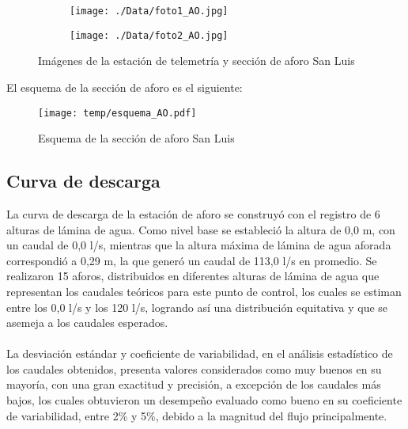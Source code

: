 \documentclass[]{article}
\begin{document}
\begin{figure}[H]
  \centering
\begin{subfigure}{.49\textwidth}
  \texttt{[image: ./Data/foto1\_AO.jpg]}
\end{subfigure}
\hfill
\begin{subfigure}{.49\textwidth}
  \texttt{[image: ./Data/foto2\_AO.jpg]}
\end{subfigure}
\caption{Imágenes de la estación de telemetría y sección de aforo San Luis}
\label{fig:fotos_15}
\end{figure}

El esquema de la sección de aforo es el siguiente:

\begin{figure}[H]
  \centering
  \texttt{[image: temp/esquema\_AO.pdf]}
\caption{Esquema de la sección de aforo San Luis}
\label{fig:Esquema_AO}
\end{figure}

\subsection{Curva de descarga}\label{curva-de-descarga-14}

La curva de descarga de la estación de aforo se construyó con el registro de 6 alturas de lámina de agua. Como nivel base se estableció la altura de 0,0 m, con un caudal de 0,0 l/s, mientras que la altura máxima de lámina de agua aforada correspondió a 0,29 m, la que generó un caudal de 113,0 l/s en promedio. Se realizaron 15 aforos, distribuidos en diferentes alturas de lámina de agua que representan los caudales teóricos para este punto de control, los cuales se estiman entre los 0,0 l/s y los 120 l/s, logrando así una distribución equitativa y que se asemeja a los caudales esperados.\\
\\
La desviación estándar y coeficiente de variabilidad, en el análisis estadístico de los caudales obtenidos, presenta valores considerados como muy buenos en su mayoría, con una gran exactitud y precisión, a excepción de los caudales más bajos, los cuales obtuvieron un desempeño evaluado como bueno en su coeficiente de variabilidad, entre 2\% y 5\%, debido a la magnitud del flujo principalmente.
\end{document}
